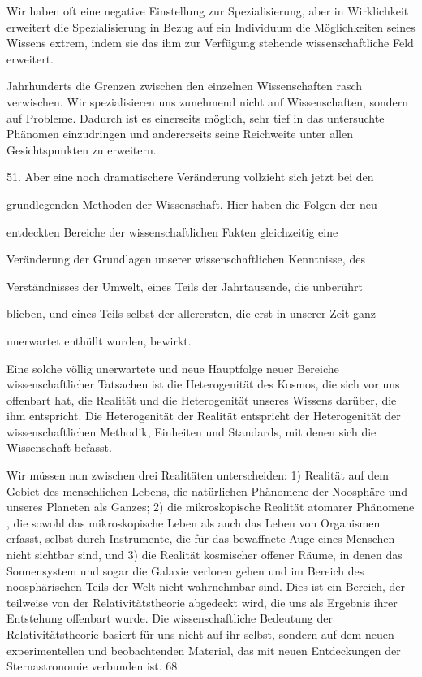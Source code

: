 \documentclass[11pt,a4paper]{book}
\begin{document}
Wir haben oft eine negative Einstellung zur Spezialisierung, aber in Wirklichkeit erweitert die Spezialisierung in Bezug auf ein Individuum die Möglichkeiten seines Wissens extrem, indem sie das ihm zur Verfügung stehende wissenschaftliche Feld erweitert. 

Jahrhunderts die Grenzen zwischen den einzelnen Wissenschaften rasch verwischen. Wir spezialisieren uns zunehmend nicht auf Wissenschaften, sondern auf Probleme. Dadurch ist es einerseits möglich, sehr tief in das untersuchte Phänomen einzudringen und andererseits seine Reichweite unter allen Gesichtspunkten zu erweitern. 

51. Aber eine noch dramatischere Veränderung vollzieht sich jetzt bei den

grundlegenden Methoden der Wissenschaft. Hier haben die Folgen der neu

entdeckten Bereiche der wissenschaftlichen Fakten gleichzeitig eine

Veränderung der Grundlagen unserer wissenschaftlichen Kenntnisse, des

Verständnisses der Umwelt, eines Teils der Jahrtausende, die unberührt

blieben, und eines Teils selbst der allerersten, die erst in unserer Zeit ganz

unerwartet enthüllt wurden, bewirkt.







Eine solche völlig unerwartete und neue Hauptfolge neuer Bereiche wissenschaftlicher Tatsachen ist die Heterogenität des Kosmos, die sich vor uns offenbart hat, die Realität und die Heterogenität unseres Wissens darüber, die ihm entspricht. Die Heterogenität der Realität entspricht der Heterogenität der wissenschaftlichen Methodik, Einheiten und Standards, mit denen sich die Wissenschaft befasst.



Wir müssen nun zwischen drei Realitäten unterscheiden: 1) Realität auf dem Gebiet des menschlichen Lebens, die natürlichen Phänomene der Noosphäre und unseres Planeten als Ganzes; 2) die mikroskopische Realität atomarer Phänomene , die sowohl das mikroskopische Leben als auch das Leben von Organismen erfasst, selbst durch Instrumente, die für das bewaffnete Auge eines Menschen nicht sichtbar sind, und 3) die Realität kosmischer offener Räume, in denen das Sonnensystem und sogar die Galaxie verloren gehen und im Bereich des noosphärischen Teils der Welt nicht wahrnehmbar sind. Dies ist ein Bereich, der teilweise von der Relativitätstheorie abgedeckt wird, die uns als Ergebnis ihrer Entstehung offenbart wurde. Die wissenschaftliche Bedeutung der Relativitätstheorie basiert für uns nicht auf ihr selbst, sondern auf dem neuen experimentellen und beobachtenden Material, das mit neuen Entdeckungen der Sternastronomie verbunden ist. 68
\end{document}
